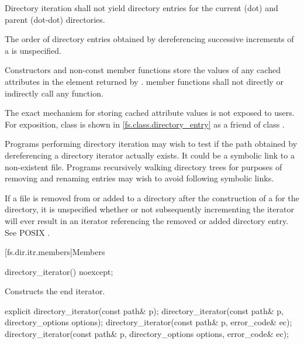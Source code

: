 \pnum
Directory iteration shall not yield directory entries for the current (dot)
and parent (dot-dot) directories.

\pnum
The order of directory entries obtained by dereferencing successive
increments of a  is unspecified.

\pnum
Constructors and non-const  member functions
store the values of any cached attributes
in the  element returned by .
 member functions shall not directly or indirectly call
any   function.
\begin{note}
The exact mechanism for storing cached attribute values is not exposed to users.
For exposition, class  is shown in \ref{fs.class.directory_entry}
as a friend of class .
\end{note}

\pnum
\begin{note}
Programs performing directory iteration may wish to test if the
path obtained by dereferencing a directory iterator actually exists. It could be
a symbolic link to a non-existent file. Programs recursively
walking directory trees for purposes of removing and renaming entries may wish
to avoid following symbolic links.
\end{note}

\pnum
\begin{note}
If a file  is removed from or added to a directory after the
construction of a  for the directory, it is
unspecified whether or not subsequently incrementing the iterator will ever
result in an iterator referencing the removed or added directory entry. See
POSIX .
\end{note}

[fs.dir.itr.members]{Members}

%
\begin{itemdecl}
directory_iterator() noexcept;
\end{itemdecl}

\begin{itemdescr}
\pnum
\effects Constructs the end iterator.
\end{itemdescr}

%
\begin{itemdecl}
explicit directory_iterator(const path& p);
directory_iterator(const path& p, directory_options options);
directory_iterator(const path& p, error_code& ec);
directory_iterator(const path& p, directory_options options, error_code& ec);
\end{itemdecl}

